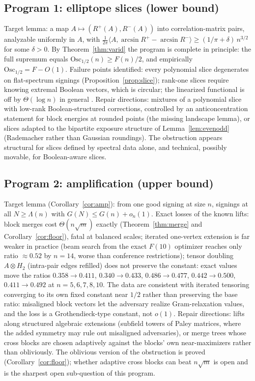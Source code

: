 \documentclass[11pt]{article}
\theoremstyle{remark}
\newcommand{\Osc}{\mathrm{Osc}}
\begin{document}
\subsection*{Program 1: elliptope slices (lower bound)}
Target lemma: a map $A\mapsto(R^+(A),R^-(A))$ into correlation-matrix
pairs, analyzable uniformly in $A$, with
$\tfrac1{2\pi}\langle A,\arcsin R^+-\arcsin R^-\rangle
\ge(1/\pi+\delta)\,n^{3/2}$ for some $\delta>0$. By
Theorem~\ref{thm:varid} the program is complete in principle: the full
supremum equals $\Osc_{1/2}(n)\ge F(n)/2$, and empirically
$\Osc_{1/2}=F-O(1)$. Failure points identified: every polynomial slice
degenerates on flat-spectrum signings
(Proposition~\ref{prop:slice}); rank-one slices require knowing
extremal Boolean vectors, which is circular; the linearized functional
is off by $\Theta(\log n)$ in general \cite{ammn}. Repair directions:
mixtures of a polynomial slice with low-rank Boolean-structured
corrections, controlled by an anticoncentration statement for block
energies at rounded points (the missing landscape lemma), or slices
adapted to the bipartite exposure structure of
Lemma~\ref{lem:evenodd} (Rademacher rather than Gaussian roundings).
The obstruction appears structural for slices defined by spectral data
alone, and technical, possibly movable, for Boolean-aware slices.

\subsection*{Program 2: amplification (upper bound)}
Target lemma (Corollary~\ref{cor:amp}): from one good signing at size
$n$, signings at all $N\ge\Lambda(n)$ with
$G(N)\le G(n)+o_n(1)$. Exact losses of the known lifts:
block merges cost $\Theta(n\sqrt m)$ exactly
(Theorem~\ref{thm:merge} and Corollary~\ref{cor:floor}), fatal at
balanced scales; iterated one-vertex extension is far weaker in
practice (beam search from the exact $F(10)$ optimizer reaches only
ratio $\approx0.52$ by $n=14$, worse than conference restrictions);
tensor doubling $A\otimes H_2$ (intra-pair edges refilled) does not
preserve the constant: exact values move the ratios
$0.358\to0.411$, $0.340\to0.433$, $0.486\to0.477$, $0.442\to0.500$,
$0.411\to0.492$ at $n=5,6,7,8,10$. The data are consistent with
iterated tensoring converging to its own fixed constant near $1/2$
rather than preserving the base ratio: misaligned block vectors let
the adversary realize Gram-relaxation values, and the loss is a
Grothendieck-type constant, not $o(1)$. Repair directions: lifts along
structured algebraic extensions (subfield towers of Paley matrices,
where the added symmetry may rule out misaligned adversaries), or
merge trees whose cross blocks are chosen adaptively against the
blocks' own near-maximizers rather than obliviously. The oblivious
version of the obstruction is proved (Corollary~\ref{cor:floor});
whether adaptive cross blocks can beat $n\sqrt m$ is open and is the
sharpest open sub-question of this program.
\end{document}
